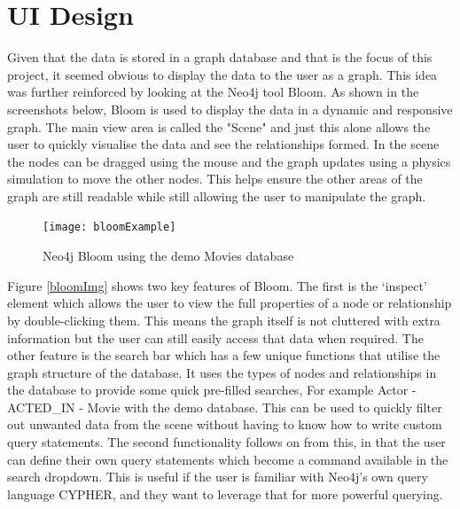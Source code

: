 \section{UI Design}
Given that the data is stored in a graph database and that is the focus of this project, it seemed obvious to display the data 
to the user as a graph. This idea was further reinforced by looking at the Neo4j tool Bloom. As shown in the screenshots below, 
Bloom is used to display the data in a dynamic and responsive graph. The main view area is called the "Scene" and just this alone allows 
the user to quickly visualise the data and see the relationships formed. In the scene the nodes can be dragged using the mouse and the graph updates 
using a physics simulation to move the other nodes. This helps ensure the other areas of the graph are still readable while still allowing the 
user to manipulate the graph.
\begin{figure}[H]
    \centering
    \texttt{[image: bloomExample]}
    \caption{Neo4j Bloom using the demo Movies database}
\end{figure}
Figure \ref{bloomImg} shows two key features of Bloom. The first is the `inspect' element which allows the user to view the full properties 
of a node or relationship by double-clicking them. This means the graph itself is not cluttered with extra information but the user can 
still easily access that data when required. The other feature is the search bar which has a few unique functions that utilise the 
graph structure of the database. It uses the types of nodes and relationships in the database to provide some quick pre-filled searches, 
For example Actor - ACTED\_IN - Movie with the demo database. This can be used to quickly filter out unwanted data from the scene without having to know 
how to write custom query statements. The second functionality follows on from this, in that the user can define their own query statements which 
become a command available in the search dropdown. This is useful if the user is familiar with Neo4j's own query language CYPHER, and they want 
to leverage that for more powerful querying.
